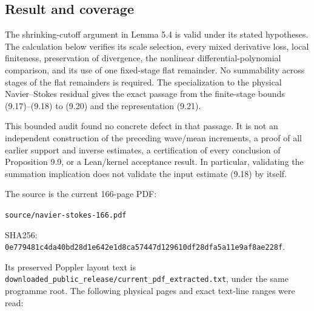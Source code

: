 \documentclass[10pt,a4paper]{article}
\begin{document}
\subsection{Result and coverage}\label{result-and-coverage}

The shrinking-cutoff argument in Lemma 5.4 is valid under its stated hypotheses. The calculation below verifies its scale selection, every mixed derivative loss, local finiteness, preservation of divergence, the nonlinear differential-polynomial comparison, and its use of one fixed-stage flat remainder. No summability across stages of the flat remainders is required. The specialization to the physical Navier--Stokes residual gives the exact passage from the finite-stage bounds (9.17)--(9.18) to (9.20) and the representation (9.21).

This bounded audit found no concrete defect in that passage. It is not an independent construction of the preceding wave/mean increments, a proof of all earlier support and inverse estimates, a certification of every conclusion of Proposition 9.9, or a Lean/kernel acceptance result. In particular, validating the summation implication does not validate the input estimate (9.18) by itself.

The source is the current 166-page PDF:

\texttt{source/navier-stokes-166.pdf}

SHA256: \nolinkurl{0e779481c4da40bd28d1e642e1d8ca57447d129610df28dfa5a11e9af8ae228f}.

Its preserved Poppler layout text is \texttt{downloaded\_public\_release/current\_pdf\_extracted.txt}, under the same programme root. The following physical pages and exact text-line ranges were read:
\end{document}

